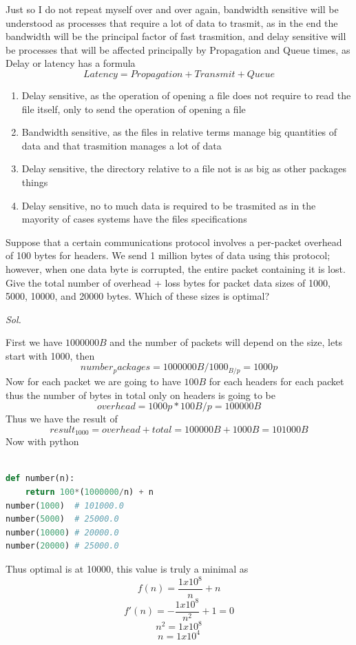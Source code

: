 \documentclass{assignment}
\begin{document}
Just so I do not repeat myself over and over again, bandwidth sensitive will be
understood as processes that require a lot of data to trasmit, as in the end the
bandwidth will be the principal factor of fast trasmition, and delay sensitive
will be processes that will be affected principally by Propagation and Queue
times, as Delay or latency has a formula 
$$Latency = Propagation + Transmit + Queue$$
\begin{enumerate}
  \item Delay sensitive, as the operation of opening a file does not require to
    read the file itself, only to send the operation of opening a file
  \item Bandwidth sensitive, as the files in relative terms manage big quantities
    of data and that trasmition manages a lot of data
  \item Delay sensitive, the directory relative to a file not is as big as other packages
    things
  \item Delay sensitive, no to much data is required to be trasmited as in the
    mayority of cases systems have the files specifications
\end{enumerate}

\newpage
\begin{ex}
  Suppose that a certain communications protocol involves a per-packet overhead of 100 bytes for 
headers. We send 1 million bytes of data using this protocol; however, when one data byte is corrupted, 
the entire packet containing it is lost. Give the total number of overhead + loss bytes for packet data 
sizes of 1000, 5000, 10000, and 20000 bytes. Which of these sizes is optimal?
\end{ex}
\textit{ Sol. }

First we have $1000000B$  and the number of packets will depend on the size,
lets start with 1000, then 
$$number_packages = 1000000B/1000_{B/p} = 1000p $$
Now for each packet we are going to have $100B$ for each headers for each packet
thus the number of bytes in total only on headers is going to be
$$overhead = 1000p * 100B/p = 100000B$$
Thus we have the result of
$$ result_{1000} = overhead  + total =  100000B + 1000B = 101000B$$
Now with python
\begin{lstlisting}[language=Python]

def number(n):
    return 100*(1000000/n) + n
number(1000)  # 101000.0
number(5000)  # 25000.0
number(10000) # 20000.0
number(20000) # 25000.0
\end{lstlisting}
Thus optimal is at 10000, this value is truly a minimal as
$$f(n) =  \frac{1x10^8}{n} + n $$
$$f'(n) =  -\frac{1x10^8}{n^2} + 1 = 0 $$
$$ n^2 = 1x10^8$$
$$ n = 1x10^4$$
\end{document}
